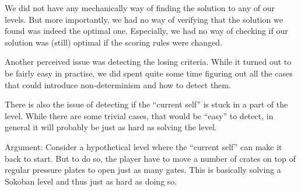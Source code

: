 We did not have any mechanically way of finding the solution to any of
our levels.  But more importantly, we had no way of verifying that the
solution we found was indeed the optimal one.  Especially, we had no
way of checking if our solution was (still) optimal if the scoring rules
were changed.

Another perceived issue was detecting the losing criteria.  While it
turned out to be fairly easy in practise, we did spent quite some time
figuring out all the cases that could introduce non-determinism and
how to detect them.

There is also the issue of detecting if the ``current self'' is
stuck in a part of the level.  While there are some trivial cases,
that would be ``easy'' to detect, in general it will probably be
just as hard as solving the level.

Argument: Consider a hypothetical level where the ``current self'' can
make it back to start.  But to do so, the player have to move a number
of crates on top of regular pressure plates to open just as many
gates.  This is basically solving a Sokoban level and thus just as
hard as doing so.

